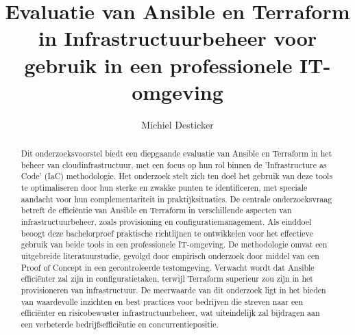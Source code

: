 \documentclass{hogent-article}
\title{Evaluatie van Ansible en Terraform in Infrastructuurbeheer voor gebruik in een professionele IT-omgeving}
\author{Michiel Desticker}
\begin{document}
\begin{abstract}
  
  Dit onderzoeksvoorstel biedt een diepgaande evaluatie van Ansible en Terraform in het beheer van cloudinfrastructuur, met een focus op hun rol binnen de 'Infrastructure as Code' (IaC) methodologie. Het onderzoek stelt zich ten doel het gebruik van deze tools te optimaliseren door hun sterke en zwakke punten te identificeren, met speciale aandacht voor hun complementariteit in praktijksituaties. De centrale onderzoeksvraag betreft de efficiëntie van Ansible en Terraform in verschillende aspecten van infrastructuurbeheer, zoals provisioning en configuratiemanagement. Als einddoel beoogt deze bachelorproef praktische richtlijnen te ontwikkelen voor het effectieve gebruik van beide tools in een professionele IT-omgeving. De methodologie omvat een uitgebreide literatuurstudie, gevolgd door empirisch onderzoek door middel van een Proof of Concept in een gecontroleerde testomgeving. Verwacht wordt dat Ansible efficiënter zal zijn in configuratietaken, terwijl Terraform superieur zou zijn in het provisioneren van infrastructuur. De meerwaarde van dit onderzoek ligt in het bieden van waardevolle inzichten en best practices voor bedrijven die streven naar een efficiënter en risicobewuster infrastructuurbeheer, wat uiteindelijk zal bijdragen aan een verbeterde bedrijfsefficiëntie en concurrentiepositie.

\end{abstract}

\tableofcontents



\printbibliography[heading=bibintoc]
\end{document}
